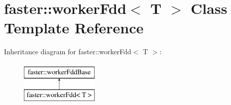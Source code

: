 \hypertarget{classfaster_1_1workerFdd}{}\section{faster\+:\+:worker\+Fdd$<$ T $>$ Class Template Reference}
\label{classfaster_1_1workerFdd}
Inheritance diagram for faster\+:\+:worker\+Fdd$<$ T $>$\+:\begin{figure}[H]
\begin{center}
\leavevmode
\includegraphics[height=2.000000cm]{classfaster_1_1workerFdd}
\end{center}
\end{figure}
